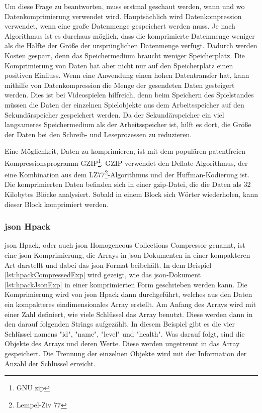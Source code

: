 Um diese Frage zu beantworten, muss erstmal geschaut werden, wann und wo Datenkomprimierung verwendet wird. Hauptsächlich wird Datenkompression verwendet, wenn eine große Datenmenge gespeichert werden muss. Je nach Algorithmus ist es durchaus möglich, dass die komprimierte Datenmenge weniger als die Hälfte der Größe der ursprünglichen Datenmenge verfügt. Dadurch werden Kosten gespart, denn das Speichermedium braucht weniger Speicherplatz. Die Komprimierung von Daten hat aber nicht nur auf den Speicherplatz einen positiven Einfluss. Wenn eine Anwendung einen hohen Datentransfer hat, kann mithilfe von Datenkompression die Menge der gesendeten Daten gesteigert werden. Dies ist bei Videospielen hilfreich, denn beim Speichern des Spielstandes müssen die Daten der einzelnen Spielobjekte aus dem Arbeitsspeicher auf den Sekundärspeicher gespeichert werden. Da der Sekundärspeicher ein viel langsameres Speichermedium als der Arbeitsspeicher ist, hilft es dort, die Größe der Daten bei den Schreib- und Leseprozessen zu reduzieren.\cite{mediumWhenDataCompression}

Eine Möglichkeit, Daten zu komprimieren, ist mit dem populären patentfreien Kompressionsprogramm GZIP\footnote{GNU zip}. GZIP verwendet den Deflate-Algorithmus, der eine Kombination aus dem  LZ77\footnote{Lempel-Ziv 77}-Algorithmus und der Huffman-Kodierung ist. Die komprimierten Daten befinden sich in einer gzip-Datei, die die Daten als 32 Kilobytes Blöcke analysiert. Sobald in einem Block sich Wörter wiederholen, kann dieser Block komprimiert werden. \cite{gnuGzip}\cite{1414952}\cite{seobilityGzipFunktioniert}

\subsubsection{\ac{json} Hpack}
\ac{json} Hpack, oder auch \ac{json} Homogeneous Collections Compressor genannt, ist eine \ac{json}-Komprimierung, die Arrays in \ac{json}-Dokumenten in einer kompakteren Art darstellt und dabei das \ac{json}-Format beibehält. In dem Beispiel \ref{lst:hpackCompressedExp} wird gezeigt, wie das \ac{json}-Dokument \ref{lst:hpackJsonExp} in einer komprimierten Form geschrieben werden kann. Die Komprimierung wird von \ac{json} Hpack dann durchgeführt, welches aus den Daten ein kompakteres eindimensionales Array erstellt. Am Anfang des Arrays wird mit einer Zahl definiert, wie viele Schlüssel das Array benutzt. Diese werden dann in den darauf folgenden Strings aufgezählt. In diesem Beispiel gibt es die vier Schlüssel namens "id", "name", "level" und "health". Was darauf folgt, sind die Objekte des Arrays und deren Werte. Diese werden ungetrennt in das Array gespeichert. Die Trennung der einzelnen Objekte wird mit der Information der Anzahl der Schlüssel erreicht.
\cite{webreflectionLastVersion}


